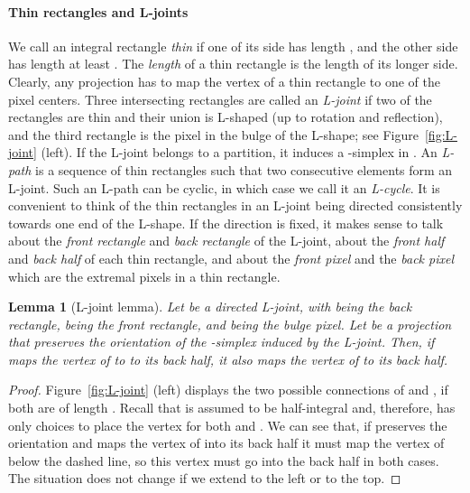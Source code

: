 \documentclass[12pt]{article}
\newtheorem{lemma}[theorem]{Lemma}
\begin{document}
\paragraph{Thin rectangles and L-joints}
We call an integral rectangle \emph{thin} if one of its side has length , and the 
other side has length at least .
The \emph{length}  of a thin rectangle is the length of its longer side. 
Clearly, any projection has to map the vertex of a thin rectangle 
to one of the  pixel centers.
Three intersecting rectangles are called an \emph{L-joint} if two of the rectangles
are thin and their union is L-shaped (up to rotation and reflection), and the third
rectangle is the pixel in the bulge of the L-shape; see Figure~\ref{fig:L-joint} (left).
If the L-joint belongs to a partition, it induces a -simplex in .
An \emph{L-path} is a sequence of thin rectangles such that two consecutive elements
form an L-joint.
Such an L-path can be cyclic, in which case we call it an \emph{L-cycle}.
It is convenient to think of the thin rectangles in an L-joint being directed consistently
towards one end of the L-shape. If the direction is fixed, it makes sense to talk
about the \emph{front rectangle} and \emph{back rectangle} of the L-joint, 
about the \emph{front half} and \emph{back half} of each thin rectangle, and about 
the \emph{front pixel} and the \emph{back pixel} 
which are the extremal pixels in a thin rectangle.

\begin{lemma}[L-joint lemma]\label{lem:L-joint}
Let  be a directed L-joint, with  being the back rectangle, 
being the front rectangle, and  being the bulge pixel. Let  be a projection
that preserves the orientation of the -simplex induced by the L-joint.
Then, if  maps the vertex of  to to its back half, it also maps the vertex of 
to its back half.
\end{lemma}
\begin{proof}
Figure~\ref{fig:L-joint} (left) displays the two possible connections of  and ,
if both are of length . 
Recall that  is assumed to be half-integral and, therefore, has only  choices to
place the vertex for both  and .
We can see that, if  preserves the orientation
and maps the vertex of  into its back half 
it must map the vertex of  below the dashed line, so this vertex
must go into the back half in
both cases. The situation does not change if we extend  to the left or 
to the top.
\end{proof}
\end{document}
